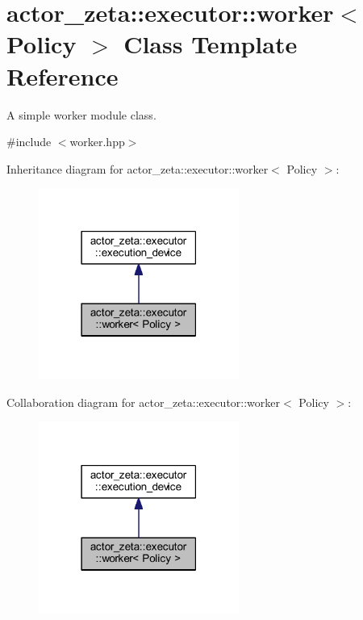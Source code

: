 \hypertarget{classactor__zeta_1_1executor_1_1worker}{}\section{actor\+\_\+zeta\+:\+:executor\+:\+:worker$<$ Policy $>$ Class Template Reference}
\label{classactor__zeta_1_1executor_1_1worker}


A simple worker module class.  




{\ttfamily \#include $<$worker.\+hpp$>$}



Inheritance diagram for actor\+\_\+zeta\+:\+:executor\+:\+:worker$<$ Policy $>$\+:\nopagebreak
\begin{figure}[H]
\begin{center}
\leavevmode
\includegraphics[width=186pt]{classactor__zeta_1_1executor_1_1worker__inherit__graph}
\end{center}
\end{figure}


Collaboration diagram for actor\+\_\+zeta\+:\+:executor\+:\+:worker$<$ Policy $>$\+:\nopagebreak
\begin{figure}[H]
\begin{center}
\leavevmode
\includegraphics[width=186pt]{classactor__zeta_1_1executor_1_1worker__coll__graph}
\end{center}
\end{figure}
